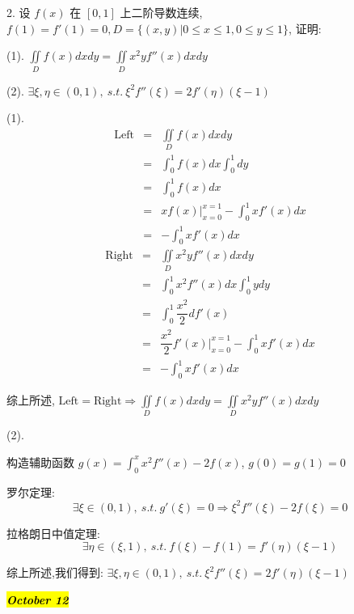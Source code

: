 2. 设 $f(x)$ 在 $[0,1]$ 上二阶导数连续, $f(1)=f'(1)=0, D=\{(x,y)|0\leq x\leq 1,0\leq y\leq 1\}$, 证明:

(1). $\displaystyle{\iint\limits_{D}f(x)dxdy=\iint\limits_{D}x^{2}yf''(x)dxdy}$

(2). $\exists \xi,\eta\in(0,1),\ s.t.\ \xi^{2}f''(\xi) = 2f'(\eta)(\xi-1)$
\begin{solution}

	(1). 
	\begin{eqnarray*}
		\text{Left} & = & \iint\limits_{D}f(x)dxdy\\
				    & = & \int_{0}^{1}f(x)dx\int_{0}^{1}dy\\
		            & = & \int_{0}^{1}f(x)dx\\
		            & = & xf(x)|_{x=0}^{x=1}-\int_{0}^{1}xf'(x)dx\\
		            & = & -\int_{0}^{1}xf'(x)dx
	\end{eqnarray*}
	\begin{eqnarray*}
		\text{Right} & = & \iint\limits_{D}x^2yf''(x)dxdy\\
					 & = & \int_{0}^{1}x^2f''(x)dx\int_{0}^{1}ydy\\
		             & = &\int_{0}^{1}\dfrac{x^2}{2}df'(x)\\
		             & = &\dfrac{x^2}{2}f'(x)|_{x=0}^{x=1}-\int_{0}^{1}xf'(x)dx\\
		             & = &-\int_{0}^{1}xf'(x)dx
	\end{eqnarray*}
	
	综上所述, $\text{Left}=\text{Right} \Rightarrow \displaystyle{\iint\limits_{D}f(x)dxdy=\iint\limits_{D}x^2yf''(x)dxdy}$
	
	(2).
	
	构造辅助函数 $g(x) = \int_{0}^{x} x^{2}f''(x)-2f(x)$, $g(0) = g(1) = 0$
	
	罗尔定理:  
	$$\exists \xi\in(0,1),\ s.t.\ g'(\xi) = 0\Rightarrow \xi^2f''(\xi)-2f(\xi) = 0$$
	
	拉格朗日中值定理:  
	$$\exists\eta\in(\xi,1),\ s.t.\ f(\xi)-f(1)=f'(\eta)(\xi-1)$$
	
	综上所述,我们得到:  $\exists \xi,\eta\in(0,1),\ s.t.\ \xi^2f''(\xi)=2f'(\eta)(\xi-1)$
\end{solution}

\hl{\textbf{\textit{October 12}}}

